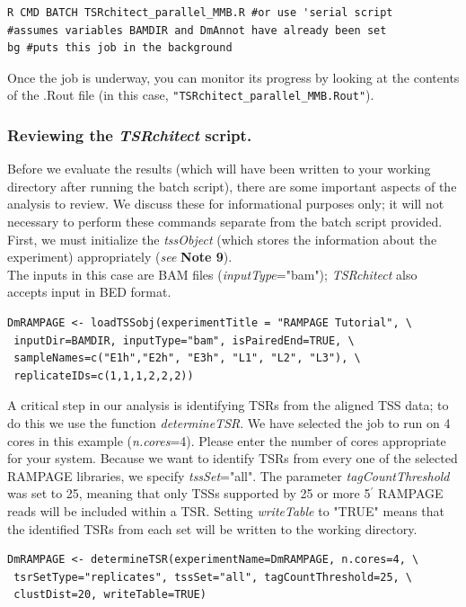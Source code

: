 \documentclass[runningheads,a4paper]{llncs}
\begin{document}
\begin{linenumbers}
\noindent
\begin{verbatim}
R CMD BATCH TSRchitect_parallel_MMB.R #or use 'serial script
#assumes variables BAMDIR and DmAnnot have already been set
bg #puts this job in the background
\end{verbatim}

\noindent
Once the job is underway, you can monitor its progress by looking at the contents of the .Rout file (in this case, \texttt{"TSRchitect\_parallel\_MMB.Rout"}). 

\subsubsection{Reviewing the \textit{TSRchitect} script.} 
Before we evaluate the results (which will have been written to your working directory after running the batch script), there are some important aspects of the analysis to review. 
We discuss these for informational purposes only; it will not necessary to perform these commands separate from the batch script provided.
First, we must initialize the \textit{tssObject} (which stores the information about the experiment) appropriately (\textit{see} \textbf{Note 9}).\\

\noindent
The inputs in this case are BAM files (\textit{inputType}="bam"); \textit{TSRchitect} also accepts input in BED format.

\noindent
\begin{verbatim}
DmRAMPAGE <- loadTSSobj(experimentTitle = "RAMPAGE Tutorial", \
 inputDir=BAMDIR, inputType="bam", isPairedEnd=TRUE, \
 sampleNames=c("E1h","E2h", "E3h", "L1", "L2", "L3"), \
 replicateIDs=c(1,1,1,2,2,2))
\end{verbatim}

\noindent
A critical step in our analysis is identifying TSRs from the aligned TSS data; to do this we use the function \textit{determineTSR}. 
We have selected the job to run on 4 cores in this example (\textit{n.cores}=4). 
Please enter the number of cores appropriate for your system.
Because we want to identify TSRs from every one of the selected RAMPAGE libraries, we specify \textit{tssSet}="all".
The parameter \textit{tagCountThreshold} was set to 25, meaning that only TSSs supported by 25 or more 5$^\prime$ RAMPAGE reads will be included within a TSR.
Setting \textit{writeTable} to "TRUE" means that the identified TSRs from each set will be written to the working directory. 

\noindent
\begin{verbatim}
DmRAMPAGE <- determineTSR(experimentName=DmRAMPAGE, n.cores=4, \
 tsrSetType="replicates", tssSet="all", tagCountThreshold=25, \
 clustDist=20, writeTable=TRUE)
\end{verbatim}


\end{linenumbers}
\end{document}

